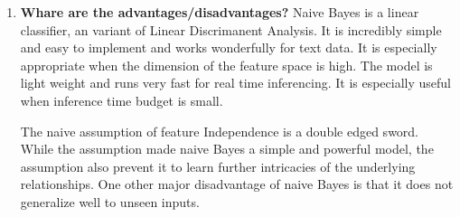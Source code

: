 \documentclass{article}
\begin{document}
\begin{enumerate}
    \item \textbf{Whare are the advantages/disadvantages?}
    \noindent 
    \smallbreak
    Naive Bayes is a linear classifier, an variant of Linear Discrimanent Analysis. It is incredibly simple and easy to implement and works wonderfully for text data. It is especially appropriate when the dimension of the feature space is high. The model is light weight and runs very fast for real time inferencing. It is especially useful when inference time budget is small.
    
    The naive assumption of feature Independence is a double edged sword. While the assumption made naive Bayes a simple and powerful model, the assumption also prevent it to learn further intricacies of the underlying relationships. One other major disadvantage of naive Bayes is that it does not generalize well to unseen inputs.
    
\end{enumerate}
\pagebreak
\end{document}
